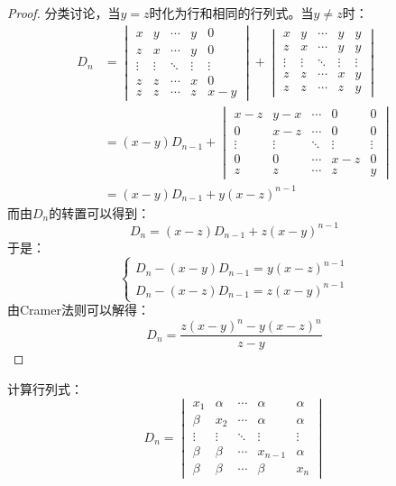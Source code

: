 \begin{proof}
	分类讨论，当$y=z$时化为行和相同的行列式。当$y\ne z$时：
	\begin{align*}
		D_n&=
		\begin{vmatrix}
			x & y & \cdots & y & 0 \\
			z & x & \cdots & y & 0 \\
			\vdots & \vdots & \ddots & \vdots & \vdots \\
			z & z & \cdots & x & 0 \\
			z & z & \cdots & z & x-y 
		\end{vmatrix}
		+
		\begin{vmatrix}
			x & y & \cdots & y & y \\
			z & x & \cdots & y & y \\
			\vdots & \vdots & \ddots & \vdots & \vdots \\
			z & z & \cdots & x & y \\
			z & z & \cdots & z & y
		\end{vmatrix} \\
		&=(x-y)D_{n-1}+
		\begin{vmatrix}
			x-z & y-x & \cdots & 0 & 0 \\
			0 & x-z & \cdots & 0 & 0 \\
			\vdots & \vdots & \ddots & \vdots & \vdots \\
			0 & 0 & \cdots & x-z & 0 \\
			z & z & \cdots & z & y
		\end{vmatrix} \\
		&=(x-y)D_{n-1}+y(x-z)^{n-1}
	\end{align*}
	而由$D_n$的转置可以得到：
	\begin{equation*}
		D_n=(x-z)D_{n-1}+z(x-y)^{n-1}
	\end{equation*}
	于是：
	\begin{equation*}
		\begin{cases}
			D_n-(x-y)D_{n-1}=y(x-z)^{n-1} \\
			D_n-(x-z)D_{n-1}=z(x-y)^{n-1}
		\end{cases}
	\end{equation*}
	由Cramer法则可以解得：
	\begin{equation*}
		D_n=\frac{z(x-y)^n-y(x-z)^n}{z-y}
	\end{equation*}
\end{proof}
\begin{theorem}
	计算行列式：
	\begin{equation*}
		D_n=
		\begin{vmatrix}
			x_1 & \alpha & \cdots & \alpha & \alpha \\
			\beta & x_2 & \cdots & \alpha & \alpha \\
			\vdots & \vdots & \ddots & \vdots & \vdots \\
			\beta & \beta & \cdots & x_{n-1} & \alpha \\
			\beta & \beta & \cdots & \beta & x_n
		\end{vmatrix}
	\end{equation*}
\end{theorem}
